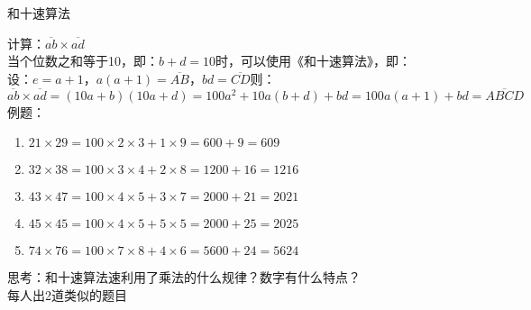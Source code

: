 \documentclass[aspectratio=169]{ctexbeamer} %
\date{\today}
\begin{document}
\begin{frame}[t]{和十速算法}
\begin{spacing}{1.2}
\normalsize
计算：$\overline{ab} \times \overline{ad}$ \\
当个位数之和等于10，即：$b + d = 10$时，可以使用《和十速算法》，即：\\
设：$e = a+1$，$a(a+1)=\overline{AB}$，$bd = \overline {CD}$则：\\
$\overline{ab} \times \overline{ad} = (10a+b)(10a+d) = 100a^2 + 10a(b+d) + bd = 100a(a+1) + bd = \overline{ABCD}$ \\
例题：
\begin{enumerate}[label={\arabic*.}]
\item $21 \times 29  = 100 \times 2 \times 3 + 1 \times 9 = 600 + 9 = 609$
\item $32 \times 38  = 100 \times 3 \times 4 + 2 \times 8 = 1200 + 16 = 1216$
\item $43 \times 47  = 100 \times 4 \times 5 + 3 \times 7 = 2000 + 21 = 2021$
\item $45 \times 45  = 100 \times 4 \times 5 + 5 \times 5 = 2000 + 25 = 2025$
\item $74 \times 76  = 100 \times 7 \times 8 + 4 \times 6 = 5600 + 24 = 5624$
\end{enumerate}
\alert{思考：和十速算法速利用了乘法的什么规律？数字有什么特点？}\\
\alert{每人出2道类似的题目}  \\

\end{spacing}
\end{frame}
\end{document}
